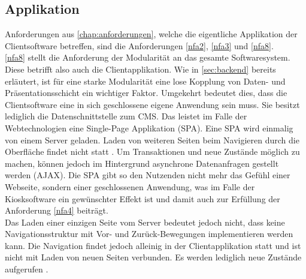 \subsection{Applikation}
\label{subs:applikation}

Anforderungen aus \autoref{chap:anforderungen}, welche die eigentliche Applikation 
der Clientsoftware betreffen, sind die Anforderungen \ref{nfa2}, \ref{nfa3} und \ref{nfa8}.\\

\ref{nfa8} stellt die Anforderung der Modularität an das gesamte Softwaresystem. Diese
betrifft also auch die Clientapplikation. Wie in \autoref{sec:backend} bereits erläutert, 
ist für eine starke Modularität eine lose Kopplung von Daten- und Präsentationsschicht ein
wichtiger Faktor. Umgekehrt bedeutet dies, dass die Clientsoftware eine in sich geschlossene
eigene Anwendung sein muss. Sie besitzt lediglich die Datenschnittstelle zum CMS. Das leistet im 
Falle der Webtechnologien eine Single-Page Applikation (SPA). Eine SPA wird einmalig von einem 
Server geladen. Laden von weiteren Seiten beim Navigieren durch die Oberfläche 
findet nicht statt \cite{js-definitive}. Um Transaktionen und neue Zustände möglich zu machen,
können jedoch im Hintergrund asynchrone Datenanfragen gestellt werden (AJAX). 
Die SPA gibt so den Nutzenden nicht mehr das Gefühl einer
Webseite, sondern einer geschlossenen Anwendung, was im Falle der Kiosksoftware ein gewünschter
Effekt ist und damit auch zur Erfüllung der Anforderung \ref{nfa4} beiträgt.\\
Das Laden einer einzigen Seite vom Server bedeutet jedoch nicht, dass keine Navigationsstruktur
mit Vor- und Zurück-Bewegungen implementieren werden kann. Die Navigation findet jedoch alleinig in 
der Clientapplikation statt und ist nicht mit Laden von neuen Seiten verbunden. Es werden lediglich
neue Zustände aufgerufen \cite{spa-manifesto}.\\

